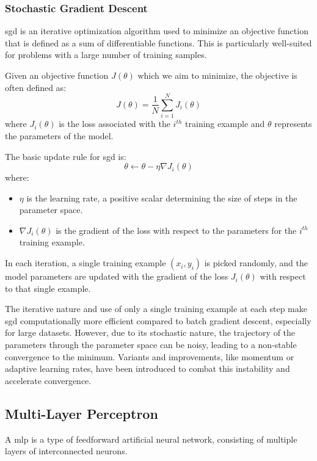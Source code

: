 \subsubsection{Stochastic Gradient Descent}

\gls{sgd} is an iterative optimization algorithm used to minimize an objective function that is defined as a sum of differentiable functions. This is particularly well-suited for problems with a large number of training samples.

Given an objective function \( J(\theta) \) which we aim to minimize, the objective is often defined as:
\[
J(\theta) = \frac{1}{N} \sum_{i=1}^{N} J_i(\theta)
\]
where \( J_i(\theta) \) is the loss associated with the \( i^{th} \) training example and \( \theta \) represents the parameters of the model.

The basic update rule for \gls{sgd} is:
\[
\theta \leftarrow \theta - \eta \nabla J_i(\theta)
\]
where:
\begin{itemize}
	\item \( \eta \) is the learning rate, a positive scalar determining the size of steps in the parameter space.
	\item \( \nabla J_i(\theta) \) is the gradient of the loss with respect to the parameters for the \( i^{th} \) training example.
\end{itemize}

In each iteration, a single training example \( (x_i, y_i) \) is picked randomly, and the model parameters are updated with the gradient of the loss \( J_i(\theta) \) with respect to that single example.

The iterative nature and use of only a single training example at each step make \gls{sgd} computationally more efficient compared to batch gradient descent, especially for large datasets. However, due to its stochastic nature, the trajectory of the parameters through the parameter space can be noisy, leading to a non-stable convergence to the minimum. Variants and improvements, like momentum or adaptive learning rates, have been introduced to combat this instability and accelerate convergence.

\subsection{Multi-Layer Perceptron}

A \gls{mlp} is a type of feedforward artificial neural network, consisting of multiple layers of interconnected neurons.

